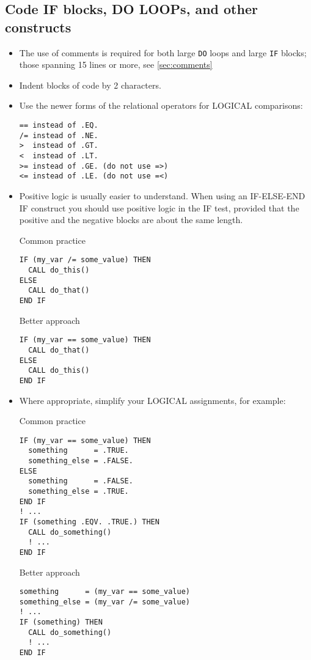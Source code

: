 \subsection{Code IF blocks, DO LOOPs, and other constructs}\label{sec:blocks}
\begin{itemize}
\item The use of comments is required for both large
\verb|DO| loops and large \verb|IF| blocks; those spanning 15 lines or more, see
\ref{sec:comments}
\item Indent blocks of code by 2 characters.
\item Use the newer forms of the relational operators for LOGICAL comparisons:
\begin{verbatim}
== instead of .EQ.
/= instead of .NE.
>  instead of .GT.
<  instead of .LT.
>= instead of .GE. (do not use =>)
<= instead of .LE. (do not use =<)
\end{verbatim}

\item Positive logic is usually easier to understand.
When using an IF-ELSE-END IF construct you should use
positive logic in the IF test, provided that the positive and the
negative blocks are about the same length.

Common practice
\begin{verbatim}
IF (my_var /= some_value) THEN
  CALL do_this()
ELSE
  CALL do_that()
END IF
\end{verbatim}
Better approach
\begin{verbatim}
IF (my_var == some_value) THEN
  CALL do_that()
ELSE
  CALL do_this()
END IF
\end{verbatim}

\item Where appropriate, simplify your LOGICAL assignments, for example:

\begin{samepage}
Common practice
\begin{verbatim}
IF (my_var == some_value) THEN
  something      = .TRUE.
  something_else = .FALSE.
ELSE
  something      = .FALSE.
  something_else = .TRUE.
END IF
! ...
IF (something .EQV. .TRUE.) THEN
  CALL do_something()
  ! ...
END IF
\end{verbatim}
\end{samepage}
\pagebreak[0]
\begin{samepage}
Better approach
\begin{verbatim}
something      = (my_var == some_value)
something_else = (my_var /= some_value)
! ...
IF (something) THEN
  CALL do_something()
  ! ...
END IF
\end{verbatim}
\end{samepage}


\end{itemize}
